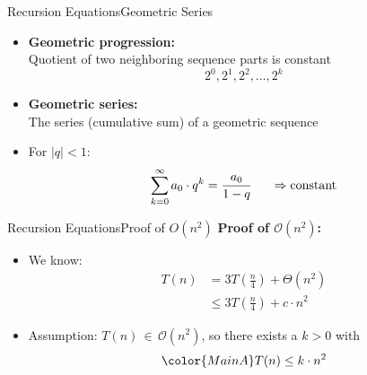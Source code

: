 \begin{frame}{Recursion Equations}{Geometric Series}
  \begin{itemize}
    \item
      \textbf{Geometric progression:}\\
      Quotient of two neighboring sequence parts is constant
      \begin{displaymath}
        2^0, 2^1, 2^2, \ldots, 2^k
      \end{displaymath}
    \item<2->
      \textbf{Geometric series:}\\
      The series (cumulative sum) of a geometric sequence\\
    \item<3->
      For $\mid q \mid < 1$:
      \begin{displaymath}
        \sum\limits^{\infty}_{k=0} a_0 \cdot q^k = \dfrac{a_0}{1 - q}
        \hspace{1.5em}\Rightarrow\text{constant}
      \end{displaymath}
  \end{itemize}
\end{frame}


\begin{frame}{Recursion Equations}{Proof of $O(n^2)$}
  \textbf{Proof of $\mathcal{O}(n^2)$:}
  \begin{itemize}
    \item<2->
      We know:
      \begin{align*}
        T(n) &= 3T\left(\frac{n}{4}\right) + \Theta(n^2)\\
        {} &\leq 3T \left(\frac{n}{4}\right) + c \cdot n^2
      \end{align*}
    \item<3->
      Assumption:
      {\color{MainA}$T(n) \, \in \, \mathcal{O}(n^2)$},
      so there exists a {\color{MainA}$k > 0$} with
      \begin{displaymath}
        \color{MainA}
        T(n) \leq k \cdot n^2
      \end{displaymath}
  \end{itemize}
\end{frame}


